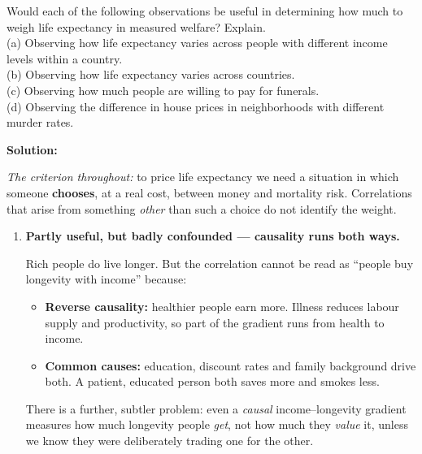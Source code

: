\documentclass[12pt, letterpaper]{article}
\begin{document}
\begin{tcolorbox}[oddbox,title={Problem 2.5 \quad Measuring the Value of Life Expectancy}]
\begin{tcolorbox}[questionbox]
Would each of the following observations be useful in determining how much to weigh life
expectancy in measured welfare? Explain.\\[3pt]
(a) Observing how life expectancy varies across people with different income levels within a
country.\\
(b) Observing how life expectancy varies across countries.\\
(c) Observing how much people are willing to pay for funerals.\\
(d) Observing the difference in house prices in neighborhoods with different murder rates.
\end{tcolorbox}

\textbf{Solution:}

\emph{The criterion throughout:} to price life expectancy we need a situation in which
someone \textbf{chooses}, at a real cost, between money and mortality risk. Correlations
that arise from something \emph{other} than such a choice do not identify the weight.

\begin{enumerate}

\item \textbf{Partly useful, but badly confounded --- causality runs both ways.}

Rich people do live longer. But the correlation cannot be read as ``people buy longevity with
income'' because:
\begin{itemize}[leftmargin=1.3em,itemsep=2pt,topsep=2pt]
\item \textbf{Reverse causality:} healthier people earn more. Illness reduces
labour supply and productivity, so part of the gradient runs from health to income.
\item \textbf{Common causes:} education, discount rates and family background drive both.
A patient, educated person both saves more and smokes less.
\end{itemize}
There is a further, subtler problem: even a \emph{causal} income--longevity gradient measures
how much longevity people \emph{get}, not how much they \emph{value} it, unless we know they
were deliberately trading one for the other.


\end{enumerate}
\end{tcolorbox}
\end{document}
